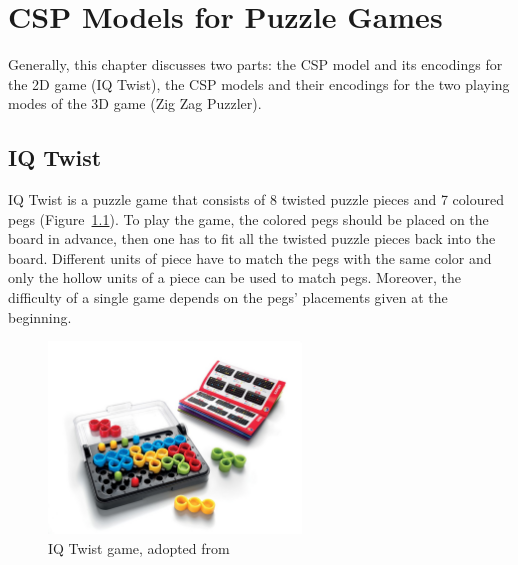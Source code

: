 \chapter{CSP Models for Puzzle Games}
\label{cha:design}
Generally, this chapter discusses two parts: the CSP model and its encodings for the 2D game (IQ Twist), the CSP models and their encodings for the two playing modes of the 3D game (Zig Zag Puzzler).
\section{IQ Twist}
IQ Twist is a puzzle game that consists of 8 twisted puzzle pieces and 7 coloured pegs (Figure~\ref{fig:IQ_twist_game}). To play the game, the colored pegs should be placed on the board in advance, then one has to fit all the twisted puzzle pieces back into the board. Different units of piece have to match the pegs with the same color and only the hollow units of a piece can be used to match pegs. Moreover, the difficulty of a single game depends on the pegs' placements given at the beginning.
\begin{figure}[htbp]
    \centering
    \includegraphics[width=0.6\textwidth]{figs/IQtwistintroduction.jpg}
    \caption{IQ Twist game, adopted from~\cite{r21}}
    \label{fig:IQ_twist_game}
\end{figure}
